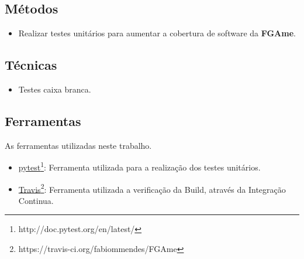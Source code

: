 \subsection{Métodos}
\begin{itemize}
    \item Realizar testes unitários para aumentar a cobertura de software da \textbf{FGAme}.
\end{itemize}

\subsection{Técnicas}
\begin{itemize}
    \item Testes caixa branca.
\end{itemize}

\subsection{Ferramentas}
As ferramentas utilizadas neste trabalho.
\begin{itemize}
    \item \href{http://doc.pytest.org/en/latest/}{pytest}\footnote{http://doc.pytest.org/en/latest/}: Ferramenta utilizada para a realização dos testes unitários.
    \item \href{https://travis-ci.org/fabiommendes/FGAme}{Travis}\footnote{https://travis-ci.org/fabiommendes/FGAme}: Ferramenta utilizada a verificação da Build, através da Integração Continua.
\end{itemize}
